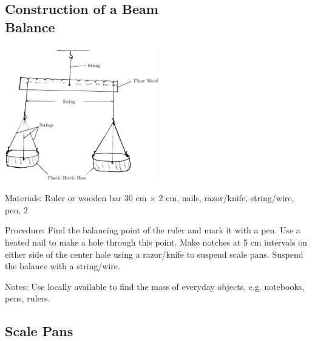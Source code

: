 \begin{multicols}{2}
\subsection[Construction of a Beam Balance]{Construction of a Beam \hfill \\ Balance} 
\label{sub:beambalance}

\begin{center}
\includegraphics[width=0.5\textwidth]{./img/beam-balance.png}
\end{center}

\begin{description*}
\item[Materials:]{Ruler or wooden bar 30 cm $\times$ 2 cm, nails, razor/knife, string/wire, pen, 2 }
\item[Procedure:]{Find the balancing point of the ruler and mark it with a pen. Use a heated nail to make a hole through this point. Make notches at 5 cm intervals on either side of the center hole using a razor/knife to suspend scale pans. Suspend the balance with a string/wire.}
\item[Notes:]{Use locally available  to find the mass of everyday objects, e.g. notebooks, pens, rulers.}
\end{description*}

\columnbreak

\subsection{Scale Pans} 
\label{sub:scalepans}


\end{multicols}
